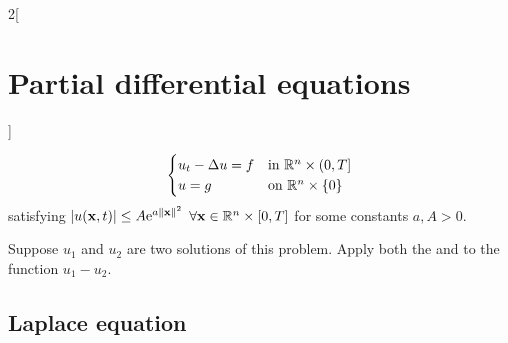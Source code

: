 \documentclass[../../../main_math.tex]{subfiles}
\begin{document}
\begin{multicols}{2}[\section{Partial differential equations}]
\begin{theorem}
$$\begin{cases}
        u_{t}  -\Delta{u} = f & \text{in $\mathbb{R}^n\times (0,T]$} \\
        u=g                       & \text{on $\mathbb{R}^n\times \{0\}$}
      \end{cases}
    $$
    satisfying $\abs{u(\boldsymbol{\mathrm{x}},t)}\leq A\mathrm{e}^{a\left\|\boldsymbol{\mathrm{x}}\right\|^2}$ $\forall \boldsymbol{\mathrm{x}}\in\mathbb{R}^n\times [0,T]$ for some constants $a, A>0$.
  \end{theorem}
  \begin{sproof}
    Suppose $u_1$ and $u_2$ are two solutions of this problem. Apply both the  and  to the function $u_1-u_2$.
  \end{sproof}
  \subsection{Laplace equation}

\end{multicols}
\end{document}
